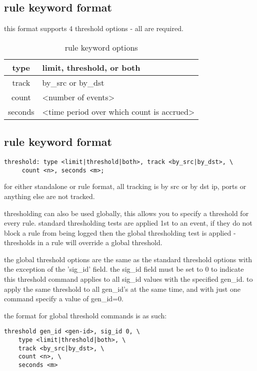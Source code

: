 \documentclass[english]{report}
\begin{document}
\subsection{rule keyword format}

this format supports 4 threshold options - all are required.

\begin{table}[!hbpt]
\caption{rule keyword options}
\begin{center}\begin{tabular}{|c|p{3.5in}|}
\hline
type & limit, threshold, or both \\
\hline
track & by\_src or by\_dst \\
\hline
count & <number of events> \\
\hline
seconds & <time period over which count is accrued> \\
\hline
\end{tabular}\end{center}
\end{table}

\subsection{rule keyword format}
\begin{verbatim}
threshold: type <limit|threshold|both>, track <by_src|by_dst>, \
     count <n>, seconds <m>;
\end{verbatim}

for either standalone or rule format, all tracking is by src or by dst ip,
ports or anything else are not tracked.

thresholding can also be used globally, this allows you to specify a threshold
for every rule.  standard thresholding tests are applied 1st to an event, if
they do not block a rule from being logged then the global thresholding
test is applied - thresholds in a rule will override a global threshold.

the global threshold options are the same as the standard threshold options
with the exception of the 'sig\_id' field.  the sig\_id field must be set to 0 to
indicate this threshold command applies to all sig\_id values with the specified
gen\_id. to apply the same threshold to all gen\_id's at the same time, and with
just one command specify a value of gen\_id=0.

the format for global threshold commands is as such:

\begin{verbatim}
threshold gen_id <gen-id>, sig_id 0, \
    type <limit|threshold|both>, \
    track <by_src|by_dst>, \
    count <n>, \
    seconds <m>  
\end{verbatim}
\end{document}
